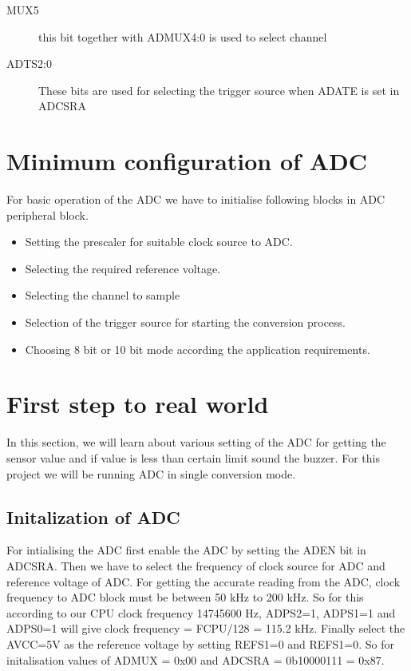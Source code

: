 \begin{description}
\item[MUX5] this bit together with ADMUX4:0 is used to select channel
\item[ADTS2:0] These bits are used for selecting the trigger source when ADATE is set in ADCSRA
\end{description}



\section{Minimum configuration of ADC}
For basic operation of the ADC we have to initialise following blocks in ADC peripheral block.
\begin{itemize}
\item Setting the prescaler for suitable clock source to ADC.
\item Selecting the required reference voltage.
\item Selecting the channel to sample
\item Selection of the trigger source for starting the conversion process.
\item Choosing 8 bit or 10 bit mode according the application requirements.
\end{itemize}

\section{First step to real world}
In this section, we will learn about various setting of the ADC for getting the sensor value and if value is less than certain limit sound the buzzer. For this project we will be running ADC in single conversion mode.
\subsection{Initalization of ADC}

For intialising the ADC first enable the ADC by setting the ADEN bit in ADCSRA. Then we have to select the frequency of clock source for ADC and reference voltage of ADC. For getting the accurate reading from the ADC, clock frequency to ADC block must be between 50 kHz to 200 kHz. So for this according to our CPU clock frequency 14745600 Hz, ADPS2=1, ADPS1=1 and ADPS0=1 will give clock frequency = FCPU/128 = 115.2 kHz. Finally select the AVCC=5V as the reference voltage by setting REFS1=0 and REFS1=0. So for initalisation values of ADMUX = 0x00 and ADCSRA = 0b10000111 = 0x87.
  

